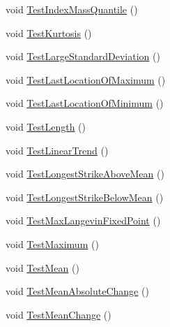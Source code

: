 \begin{DoxyCompactItemize}
\item 
void \mbox{\hyperlink{classkhiva_1_1features_1_1tests_1_1_features_tests_a77029909679e4ffa340b6b168656cc31}{Test\+Index\+Mass\+Quantile}} ()
\item 
void \mbox{\hyperlink{classkhiva_1_1features_1_1tests_1_1_features_tests_a9e9caa0a79155467822aad97d52aa0e5}{Test\+Kurtosis}} ()
\item 
void \mbox{\hyperlink{classkhiva_1_1features_1_1tests_1_1_features_tests_ad90c3b3cf8da5a70f7d0e866e79ca285}{Test\+Large\+Standard\+Deviation}} ()
\item 
void \mbox{\hyperlink{classkhiva_1_1features_1_1tests_1_1_features_tests_ad9c563f3b98aad13193417da2ee02300}{Test\+Last\+Location\+Of\+Maximum}} ()
\item 
void \mbox{\hyperlink{classkhiva_1_1features_1_1tests_1_1_features_tests_af6a9c84da0f1162c0990b7d37d377254}{Test\+Last\+Location\+Of\+Minimum}} ()
\item 
void \mbox{\hyperlink{classkhiva_1_1features_1_1tests_1_1_features_tests_a24a634bd680cacb334120dd29597fb61}{Test\+Length}} ()
\item 
void \mbox{\hyperlink{classkhiva_1_1features_1_1tests_1_1_features_tests_acc9c0b04463479b665e3676f2a30a541}{Test\+Linear\+Trend}} ()
\item 
void \mbox{\hyperlink{classkhiva_1_1features_1_1tests_1_1_features_tests_a4ea849011ede735fc163c22e0dbc6ccf}{Test\+Longest\+Strike\+Above\+Mean}} ()
\item 
void \mbox{\hyperlink{classkhiva_1_1features_1_1tests_1_1_features_tests_ab949453ddb11442fc296f0db33ada913}{Test\+Longest\+Strike\+Below\+Mean}} ()
\item 
void \mbox{\hyperlink{classkhiva_1_1features_1_1tests_1_1_features_tests_ae10f31864c2cc51f63259facb971fedb}{Test\+Max\+Langevin\+Fixed\+Point}} ()
\item 
void \mbox{\hyperlink{classkhiva_1_1features_1_1tests_1_1_features_tests_a0c211585bef72fc354978f6ac66de6b4}{Test\+Maximum}} ()
\item 
void \mbox{\hyperlink{classkhiva_1_1features_1_1tests_1_1_features_tests_afea86ba39b62a49dea5b36b290c01f43}{Test\+Mean}} ()
\item 
void \mbox{\hyperlink{classkhiva_1_1features_1_1tests_1_1_features_tests_a931e9934e6f550177df4aa91ff2a386c}{Test\+Mean\+Absolute\+Change}} ()
\item 
void \mbox{\hyperlink{classkhiva_1_1features_1_1tests_1_1_features_tests_aa8ffc02c514cd59d1ca41bfc107fc2c8}{Test\+Mean\+Change}} ()
\item 

\end{DoxyCompactItemize}
